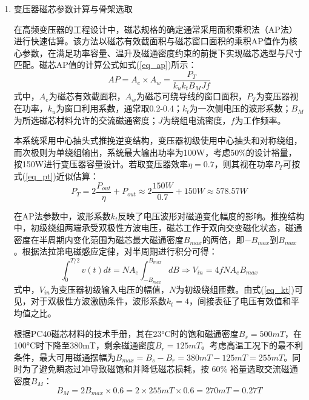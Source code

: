\begin{enumerate}[topsep = 0 pt, itemsep= 0 pt, parsep=0pt, partopsep=0pt, leftmargin=0pt, itemindent=44pt, labelsep=6pt, listparindent=24pt, label=(\arabic*)]
	\item 变压器磁芯参数计算与骨架选取

	      在高频变压器的工程设计中，磁芯规格的确定通常采用面积乘积法（AP法）进行快速估算。该方法以磁芯有效截面积与磁芯窗口面积的乘积AP值作为核心参数，在满足功率容量、温升及磁通密度约束的前提下实现磁芯选型与尺寸匹配。磁芯AP值的计算公式如式(\ref{eq_ap})所示：
	      \begin{equation}
		      AP = A_e \times A_w = \frac{P_T}{k_u k_t B_{M} J f} \label{eq_ap}
	      \end{equation}
	      式中，$A_e$为磁芯有效截面积，$A_w$为磁芯可绕导线的窗口面积，$P_T$为变压器视在功率，$k_u$为窗口利用系数，通常取0.2-0.4；$k_t$为一次侧电压的波形系数；$B_{M}$为所选磁芯材料允许的交流磁通密度；$J$为绕组电流密度，$f$为工作频率。

	      本系统采用中心抽头式推挽逆变结构，变压器初级使用中心抽头和对称绕组，而次极则为单绕组输出，系统最大输出功率为100W，考虑50\%的设计裕量，按150W进行变压器容量设计。若取变压器效率$\eta = 0.7$，则其视在功率$P_T$可按式(\ref{eq_pt})近似估算：
	      \begin{equation}
		      P_T = 2\frac{P_{out}}{\eta}+ P_{out} \approx 2\frac{150W}{0.7} + 150W \approx 578.57W \label{eq_pt}
	      \end{equation}

	      在AP法参数中，波形系数$k_t$反映了电压波形对磁通变化幅度的影响。推挽结构中，初级绕组两端承受双极性方波电压，磁芯工作于双向交变磁化状态，磁通密度在半周期内变化范围为磁芯最大磁通密度$B_{max}$的两倍，即$-B_{max}$到$B_{max}$。根据法拉第电磁感应定律，对半周期进行积分可得：
	      \begin{equation}
		      \int_0^{T/2}v(t)dt=NA_e\int_{-B_{max}}^{B_{max}}dB \Rightarrow V_{in} = 4fNA_eB_{max} \label{eq_kt}
	      \end{equation}
	      式中，$V_{in}$为变压器初级输入电压的幅值，$N$为初级绕组匝数。由式(\ref{eq_kt})可见，对于双极性方波激励条件，波形系数$k_t=4$，间接表征了电压有效值和平均值之比。

	      根据PC40磁芯材料的技术手册，其在23°C时的饱和磁通密度$B_s = 500mT$，在100°C时下降至380mT，剩余磁通密度$B_r = 125mT$。考虑高温工况下的最不利条件，最大可用磁通摆幅为$B_{max} = B_s-B_r = 380mT - 125mT = 255mT$。同时为了避免瞬态过冲导致磁饱和并降低磁芯损耗，按 60\% 裕量选取交流磁通密度$B_{M}$：
	      \begin{equation}
		      B_{M} = 2B_{max} \times 0.6 = 2\times 255mT \times 0.6 = 270mT = 0.27T \label{eq_bm}
	      \end{equation}


\end{enumerate}
